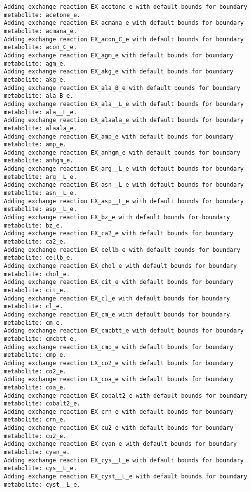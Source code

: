 \documentclass[
  letterpaper,
  DIV=11,
  numbers=noendperiod]{scrartcl}
\begin{document}
\begin{verbatim}
Adding exchange reaction EX_acetone_e with default bounds for boundary metabolite: acetone_e.
Adding exchange reaction EX_acmana_e with default bounds for boundary metabolite: acmana_e.
Adding exchange reaction EX_acon_C_e with default bounds for boundary metabolite: acon_C_e.
Adding exchange reaction EX_agm_e with default bounds for boundary metabolite: agm_e.
Adding exchange reaction EX_akg_e with default bounds for boundary metabolite: akg_e.
Adding exchange reaction EX_ala_B_e with default bounds for boundary metabolite: ala_B_e.
Adding exchange reaction EX_ala__L_e with default bounds for boundary metabolite: ala__L_e.
Adding exchange reaction EX_alaala_e with default bounds for boundary metabolite: alaala_e.
Adding exchange reaction EX_amp_e with default bounds for boundary metabolite: amp_e.
Adding exchange reaction EX_anhgm_e with default bounds for boundary metabolite: anhgm_e.
Adding exchange reaction EX_arg__L_e with default bounds for boundary metabolite: arg__L_e.
Adding exchange reaction EX_asn__L_e with default bounds for boundary metabolite: asn__L_e.
Adding exchange reaction EX_asp__L_e with default bounds for boundary metabolite: asp__L_e.
Adding exchange reaction EX_bz_e with default bounds for boundary metabolite: bz_e.
Adding exchange reaction EX_ca2_e with default bounds for boundary metabolite: ca2_e.
Adding exchange reaction EX_cellb_e with default bounds for boundary metabolite: cellb_e.
Adding exchange reaction EX_chol_e with default bounds for boundary metabolite: chol_e.
Adding exchange reaction EX_cit_e with default bounds for boundary metabolite: cit_e.
Adding exchange reaction EX_cl_e with default bounds for boundary metabolite: cl_e.
Adding exchange reaction EX_cm_e with default bounds for boundary metabolite: cm_e.
Adding exchange reaction EX_cmcbtt_e with default bounds for boundary metabolite: cmcbtt_e.
Adding exchange reaction EX_cmp_e with default bounds for boundary metabolite: cmp_e.
Adding exchange reaction EX_co2_e with default bounds for boundary metabolite: co2_e.
Adding exchange reaction EX_coa_e with default bounds for boundary metabolite: coa_e.
Adding exchange reaction EX_cobalt2_e with default bounds for boundary metabolite: cobalt2_e.
Adding exchange reaction EX_crn_e with default bounds for boundary metabolite: crn_e.
Adding exchange reaction EX_cu2_e with default bounds for boundary metabolite: cu2_e.
Adding exchange reaction EX_cyan_e with default bounds for boundary metabolite: cyan_e.
Adding exchange reaction EX_cys__L_e with default bounds for boundary metabolite: cys__L_e.
Adding exchange reaction EX_cyst__L_e with default bounds for boundary metabolite: cyst__L_e.

\end{verbatim}
\end{document}
